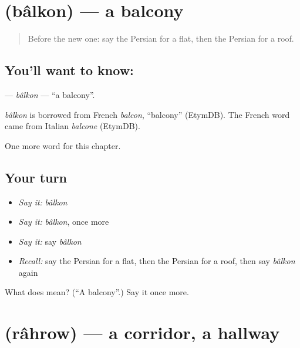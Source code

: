\section[\texorpdfstring{\fa{بالکن} (bâlkon)}{بالکن (bâlkon)}]{ (bâlkon) — a balcony}

\label{lesson:FA-C195-balkon}



\begin{quote}
Before the new one: say the Persian for a flat, then the Persian for a roof.
\end{quote}

\subsection*{You'll want to know: }
\textbf{} — \emph{bâlkon} — \textquotedblleft{}a balcony\textquotedblright{}.

\begin{cousinweb}
\emph{bâlkon} is borrowed from French \emph{balcon}, \textquotedblleft{}balcony\textquotedblright{} (EtymDB). The French word came from Italian \emph{balcone} (EtymDB).
\end{cousinweb}

\begin{grammarlens}[title={What you've built}]
One more word for this chapter.
\end{grammarlens}

\subsection*{Your turn}
\begin{itemize}
\raggedright
  \item \emph{Say it:} \emph{bâlkon}
  \item \emph{Say it:} \emph{bâlkon}, once more
  \item \emph{Say it:} say \emph{bâlkon}
  \item \emph{Recall:} say the Persian for a flat, then the Persian for a roof, then say \emph{bâlkon} again
\end{itemize}

\begin{tcolorbox}[breakable,colback=teal!4,colframe=teal!35!black,title={Before you move on}]
What does  mean? (\textquotedblleft{}A balcony\textquotedblright{}.) Say it once more.
\end{tcolorbox}
\section[\texorpdfstring{\fa{راهرو} (râhrow)}{راهرو (râhrow)}]{ (râhrow) — a corridor, a hallway}

